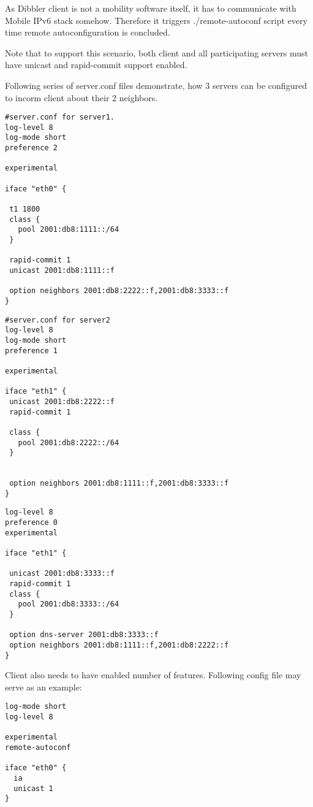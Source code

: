 \begin{enumerate}
As Dibbler client is not a mobility software itself, it has to
communicate with Mobile IPv6 stack somehow. Therefore it triggers
./remote-autoconf script every time remote autoconfiguration is
concluded.

Note that to support this scenario, both client and all participating
servers must have unicast and rapid-commit support enabled.

Following series of server.conf files demonstrate, how 3 servers can
be configured to incorm client about their 2 neighbors.

\begin{lstlisting}
#server.conf for server1.
log-level 8
log-mode short
preference 2

experimental

iface "eth0" {

 t1 1800
 class {
   pool 2001:db8:1111::/64
 }

 rapid-commit 1
 unicast 2001:db8:1111::f

 option neighbors 2001:db8:2222::f,2001:db8:3333::f
}
\end{lstlisting}

\begin{lstlisting}
#server.conf for server2
log-level 8
log-mode short
preference 1

experimental

iface "eth1" {
 unicast 2001:db8:2222::f
 rapid-commit 1

 class {
   pool 2001:db8:2222::/64
 }


 option neighbors 2001:db8:1111::f,2001:db8:3333::f
}
\end{lstlisting}

\begin{lstlisting}
log-level 8
preference 0
experimental

iface "eth1" {

 unicast 2001:db8:3333::f
 rapid-commit 1
 class {
   pool 2001:db8:3333::/64
 }

 option dns-server 2001:db8:3333::f
 option neighbors 2001:db8:1111::f,2001:db8:2222::f
}
\end{lstlisting}

Client also needs to have enabled number of features. Following config
file may serve as an example:

\begin{lstlisting}
log-mode short
log-level 8

experimental
remote-autoconf

iface "eth0" {
  ia
  unicast 1
}
\end{lstlisting}


\end{enumerate}
